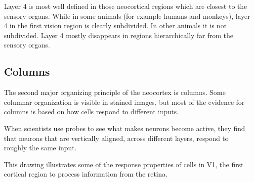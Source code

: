 \documentclass{report}
\begin{document}
Layer 4 is most well defined in those neocortical regions which are
closest to the sensory organs. While in some animals (for example
humans and monkeys), layer 4 in the first vision region is clearly
subdivided. In other animals it is not subdivided. Layer 4 mostly
disappears in regions hierarchically far from the sensory organs.

\subsection*{Columns}
The second major organizing principle of the neocortex is
columns. Some columnar organization is visible in stained images, but
most of the evidence for columns is based on how cells respond to
different inputs.

When scientists use probes to see what makes neurons become active,
they find that neurons that are vertically aligned, across different
layers, respond to roughly the same input.

\begin{figure}
\end{figure}

This drawing illustrates some of the response properties of cells in
V1, the first cortical region to process information from the retina.
\end{document}
